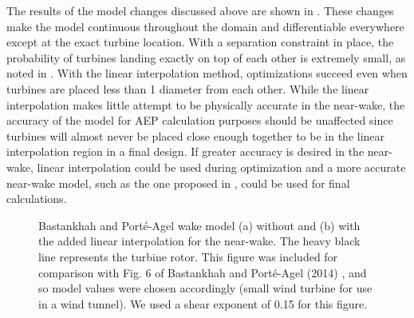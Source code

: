 \documentclass[conf]{new-aiaa}
\begin{document}
The results of the model changes discussed above are shown in . These changes make the model continuous throughout the domain and differentiable everywhere except at the exact turbine location. With a separation constraint in place, the probability of turbines landing exactly on top of each other is extremely small, as noted in \cite{thomas2017}. With the linear interpolation method, optimizations succeed even when turbines are placed less than 1 diameter from each other. While the linear interpolation makes little attempt to be physically accurate in the near-wake, the accuracy of the model for AEP calculation purposes should be unaffected since turbines will almost never be placed close enough together to be in the linear interpolation region in a final design. If greater accuracy is desired in the near-wake, linear interpolation could be used during optimization and a more accurate near-wake model, such as the one proposed in \cite{keane2016}, could be used for final calculations.

\begin{figure}[htbp!]
	\centering
	\caption{Bastankhah and Port\'{e}-Agel wake model (a) without and (b) with the added linear interpolation for the near-wake. The heavy black line represents the turbine rotor. This figure was included for comparison with Fig. 6 of Bastankhah and Port\'{e}-Agel (2014) \cite{bastankhah2014}, and so model values were chosen accordingly (small wind turbine for use in a wind tunnel). We used a shear exponent of 0.15 for this figure.}
	
	\label{fig:model_contours}
\end{figure}
\end{document}
